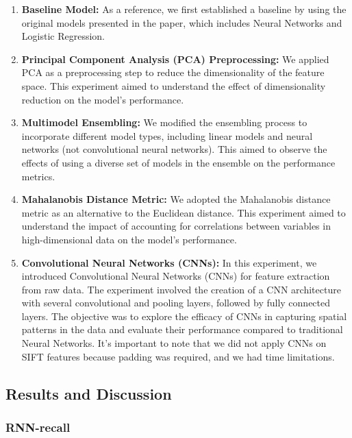 \documentclass[sigconf, nonacm]{acmart}
\begin{document}
\begin{enumerate}
    \item \textbf{Baseline Model:} As a reference, we first established a baseline by using the original models presented in the paper, which includes Neural Networks and Logistic Regression.
    
    \item \textbf{Principal Component Analysis (PCA) Preprocessing:} We applied PCA as a preprocessing step to reduce the dimensionality of the feature space. This experiment aimed to understand the effect of dimensionality reduction on the model's performance.
    
    \item \textbf{Multimodel Ensembling:} We modified the ensembling process to incorporate different model types, including linear models and neural networks (not convolutional neural networks). This aimed to observe the effects of using a diverse set of models in the ensemble on the performance metrics.
    
    \item \textbf{Mahalanobis Distance Metric:} We adopted the Mahalanobis distance metric as an alternative to the Euclidean distance. This experiment aimed to understand the impact of accounting for correlations between variables in high-dimensional data on the model's performance.
    
    \item \textbf{Convolutional Neural Networks (CNNs):} In this experiment, we introduced Convolutional Neural Networks (CNNs) for feature extraction from raw data. The experiment involved the creation of a CNN architecture with several convolutional and pooling layers, followed by fully connected layers. The objective was to explore the efficacy of CNNs in capturing spatial patterns in the data and evaluate their performance compared to traditional Neural Networks. It's important to note that we did not apply CNNs on SIFT features because padding was required, and we had time limitations.
\end{enumerate}

\subsection{Results and Discussion}

\subsubsection{RNN-recall}
\end{document}
